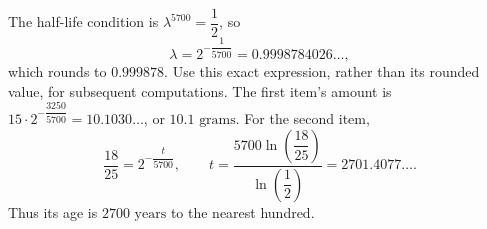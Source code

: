 The half-life condition is $\lambda^{5700}=\dfrac{1}{2}$, so
\[
\lambda=2^{-\dfrac{1}{5700}}=0.9998784026\ldots,
\]
which rounds to $\boxed{0.999878}$. Use this exact expression, rather than its rounded value, for subsequent computations.
The first item's amount is $15\cdot2^{-\dfrac{3250}{5700}}=10.1030\ldots$, or $\boxed{10.1\text{ grams}}$.
For the second item,
\[
\dfrac{18}{25}=2^{-\dfrac{t}{5700}},\qquad
t=\dfrac{5700\ln(\dfrac{18}{25})}{\ln(\dfrac{1}{2})}
=2701.4077\ldots.
\]
Thus its age is $\boxed{2700\text{ years}}$ to the nearest hundred.
